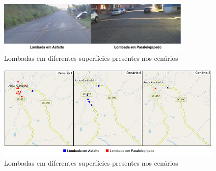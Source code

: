 \begin{figure}[h!]
  \centering
  \caption{Lombadas em diferentes superfícies presentes nos cenários}
   \label{fig:lombadas_superficies}
   \includegraphics[width=0.85\textwidth]{figuras/fig_24.png}
\end{figure}

\begin{figure}[h!]
  \centering
  \caption{Lombadas em diferentes superfícies presentes nos cenários}
   \label{fig:lombadas_mapa}
   \includegraphics[width=1\textwidth]{figuras/fig_26.png}
\end{figure}

